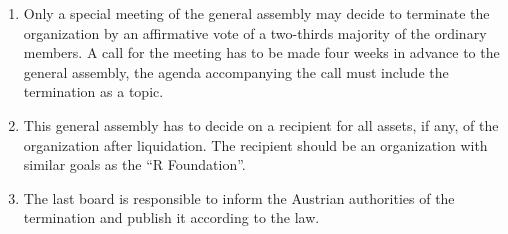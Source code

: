 \documentclass[a4paper]{article}
\newcommand{\RF}{``R Foundation''}
\begin{document}
\begin{enumerate}
 \item Only a special meeting of the general assembly may decide to
  terminate the organization by an affirmative vote of a two-thirds
  majority of the ordinary members.  A call for the meeting has to be
  made four weeks in advance to the general assembly, the agenda
  accompanying the call must include the termination as a topic.
  
 \item This general assembly has to decide on a recipient for all
  assets, if any, of the organization after liquidation. The recipient
  should be an organization with similar goals as the \RF{}.

 \item The last board is responsible to inform the Austrian
  authorities of the termination and publish it according to the law.
\end{enumerate}
\end{document}
